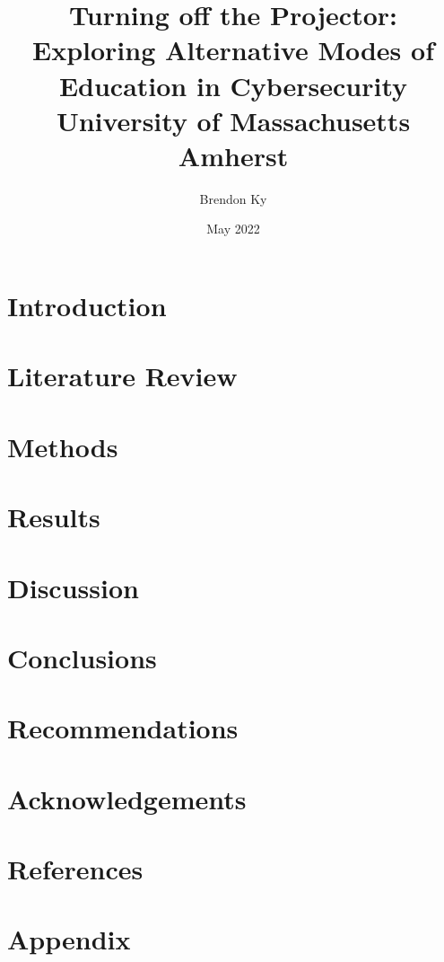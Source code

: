 \documentclass{report}
\title{
    Turning off the Projector: \\
    Exploring Alternative Modes of Education in Cybersecurity\\
    \large University of Massachusetts Amherst
}
\author{Brendon Ky}
\date{May 2022}
\newif\iffullsubmission
\begin{document}
\iffullsubmission
\maketitle


\tableofcontents
\setcounter{page}{1}

\chapter{Abstract}
    
\fi

\chapter{Introduction}
    
    
\chapter{Literature Review}
    

\chapter{Methods}
    

\chapter{Results}
    

\chapter{Discussion}
    

\chapter{Conclusions}
    

\chapter{Recommendations}
    

\chapter{Acknowledgements}
    

\chapter{References}
\printbibliography

\appendix
\chapter{Appendix}

\end{document}
